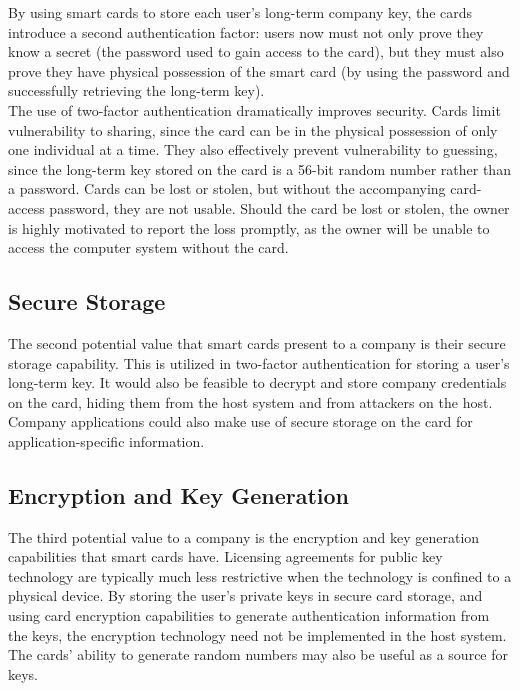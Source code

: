 By using smart cards to store each user's long-term company key, the
cards introduce a second authentication factor: users now must not only
prove they know a secret (the password used to gain access to the
card), but they must also prove they have physical possession of the
smart card (by using the password and successfully retrieving the
long-term key).\\

The use of two-factor authentication dramatically improves security.
Cards limit vulnerability to sharing, since the card can be in the
physical possession of only one individual at a time. They also
effectively prevent vulnerability to guessing, since the long-term key
stored on the card is a 56-bit random number rather than a password.
Cards can be lost or stolen, but without the accompanying card-access
password, they are not usable. Should the card be lost or stolen, the
owner is highly motivated to report the loss promptly, as the owner
will be unable to access the computer system without the card.

\subsection{Secure Storage}

The second potential value that smart cards present to a company is
their secure storage capability. This is utilized in two-factor
authentication for storing a user's long-term key. It would also be
feasible to decrypt and store company credentials on the card, hiding
them from the host system and from attackers on the host. Company
applications could also make use of secure storage on the card for
application-specific information.

\subsection{Encryption and Key Generation}

The third potential value to a company is the encryption and key
generation capabilities that smart cards have. Licensing agreements for
public key technology are typically much less restrictive when the
technology is confined to a physical device. By storing the user's
private keys in secure card storage, and using card encryption
capabilities to generate authentication information from the keys, the
encryption technology need not be implemented in the host system. The
cards' ability to generate random numbers may also be useful as a
source for keys.
